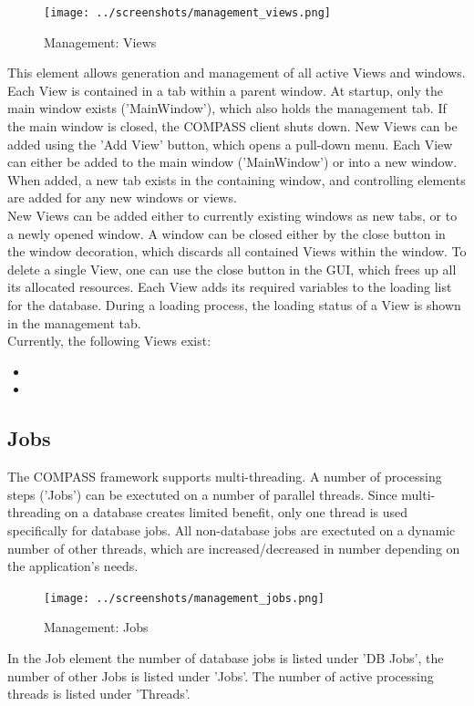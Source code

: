 \begin{figure}[H]
  \center
    \texttt{[image: ../screenshots/management\_views.png]}
  \caption{Management: Views}
\end{figure}

This element allows generation and management of all active Views and windows. Each View is contained
in a tab within a parent window.  At startup, only the main window exists ('MainWindow'), which also holds
the management tab. If the main window is closed, the COMPASS client shuts down. New Views can be added using the 'Add View' button, which opens a pull-down menu. Each View can either be added to the main window ('MainWindow') or into a new window. When added, a new tab exists in the containing window, and controlling elements are added for any new
windows or views. \\

New Views can be added either to currently existing windows as new tabs, or to a newly opened window. A window can be closed either by the close button in the window decoration, which discards all contained Views within the window.  To delete a single View, one can use the close button in the GUI, which frees up all its allocated resources. Each View adds its required variables to the loading list for the database.  During a loading process, the loading status  of a View is shown in the management tab.\\

Currently, the following Views exist:
\begin{itemize}
 \item {}
 \item {}
\end{itemize}


\subsection{Jobs}

The COMPASS framework supports multi-threading. A number of processing steps ('Jobs') can be exectuted on a number of parallel threads. Since multi-threading on a database creates limited benefit, only one thread is used specifically for database jobs. All non-database jobs are exectuted on a dynamic number of other threads, which are increased/decreased in number depending on the application's needs. 

\begin{figure}[H]
  \center
    \texttt{[image: ../screenshots/management\_jobs.png]}
  \caption{Management: Jobs}
\end{figure}

In the Job element the number of database jobs is listed under 'DB Jobs', the number of other Jobs is listed under 'Jobs'. The number of active processing threads is listed under 'Threads'.
 
